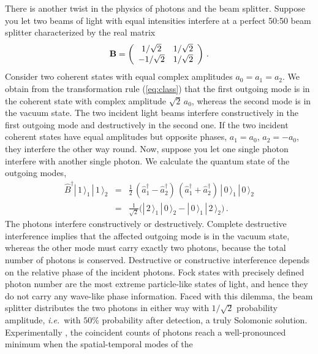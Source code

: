 \documentclass[12pt,amsmath,amssymb]{article}
\def\underline#1{{\bf #1}}
\numberwithin{equation}{section}
\begin{document}
There is another twist in the physics of photons and the beam
splitter. Suppose you let two beams of light with equal
intensities interfere at a perfect 50:50 beam splitter
characterized by the real matrix
\begin{equation}
\label{eq:5050} \underline{B} = \left(
    \begin{array}{cc}
     {1}/{\sqrt{2}} & {1}/{\sqrt{2}} \\
     -{1}/{\sqrt{2}}& {1}/{\sqrt{2}}
    \end{array}
\right) \,.
\end{equation}
Consider two coherent states with equal complex amplitudes
$a_0=a_1=a_2$. We obtain from the transformation rule
(\ref{eq:class}) that the first outgoing mode is in the coherent
state with complex amplitude $\sqrt{2}\, a_0$, whereas the second
mode is in the vacuum state. The two incident light beams
interfere constructively in the first outgoing mode and
destructively in the second one. If the two incident coherent
states have equal amplitudes but opposite phases, $a_1=a_0$,
$a_2=-a_0$, they interfere the other way round. Now, suppose you
let one single photon interfere with another single photon. We
calculate the quantum state of the outgoing modes,
\begin{eqnarray}
\hat{B}^\dagger |\,1\,\rangle_1\, |\,1\,\rangle_2 &=&
\frac{1}{2}\, \left(\hat{a}_1^\dagger-\hat{a}_2^\dagger\right)\,
\left(\hat{a}_1^\dagger+\hat{a}_2^\dagger\right)\,
|\,0\,\rangle_1\,|\,0\,\rangle_2
\nonumber\\
&=& \frac{1}{\sqrt{2}} \Big( |\,2\,\rangle_1\,|\,0\,\rangle_2 -
|\,0\,\rangle_1\,|\,2\,\rangle_2 \Big)\,. \label{eq:interfere}
\end{eqnarray}
The photons interfere constructively or destructively.
Complete destructive interference implies that the affected
outgoing mode is in the vacuum state, whereas the other mode must
carry exactly two photons, because the total number of photons is
conserved. Destructive or constructive interference depends on
the relative phase of the incident photons. Fock states with
precisely defined photon number are the most extreme particle-like
states of light, and hence they do not carry any wave-like phase
information. Faced with this dilemma, the beam splitter
distributes the two photons in either way with
$1/\sqrt{2}$ probability amplitude, {\it i.e.}\ with
$50\%$ probability after detection,
a truly Solomonic solution. Experimentally
\cite{Hong}, the coincident counts of photons reach a
well-pronounced minimum when the spatial-temporal modes of the
\end{document}
